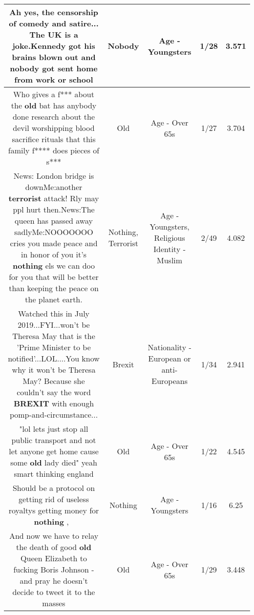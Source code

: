 \documentclass[11pt]{article}
\newlength\mylength
\begin{document}
\begin{center}
\begin{longtable}{|C{.65\mylength}|C{.30\mylength}|C{.12\mylength}|C{.12\mylength}|C{.12\mylength}|}
  \small Ah yes, the censorship of comedy and satire... The UK is a joke.Kennedy got his brains blown out and \textbf{nobody} got sent home from work or school\normalsize   & Nobody & Age - Youngsters & 1/28 & 3.571 \\  \hline
  \small Who gives a f*** about the \textbf{old} bat has anybody done research about the devil worshipping blood sacrifice rituals that this family f**** does pieces of s***\normalsize   & Old & Age - Over 65s & 1/27 & 3.704 \\  \hline
  \small News: London bridge is downMe:another \textbf{terrorist} attack! Rly may ppl hurt then.News:The queen has passed away sadlyMe:NOOOOOOO cries  you made peace and in honor of you it's \textbf{nothing} els we can doo for you that will be better  than keeping the peace on the planet earth.\normalsize   & Nothing, Terrorist & Age - Youngsters, Religious Identity - Muslim & 2/49 & 4.082 \\  \hline
  \small Watched this in July 2019...FYI...won't be Theresa May that is the 'Prime Minister to be notified'...LOL....You know why it won't be Theresa May? Because she couldn't say the word \textbf{BREXIT} with enough pomp-and-circumstance...\normalsize   & Brexit & Nationality - European or anti-Europeans & 1/34 & 2.941 \\  \hline
  \small "lol lets just stop all public transport and not let anyone get home cause some \textbf{old} lady died" yeah smart thinking england\normalsize   & Old & Age - Over 65s & 1/22 & 4.545 \\  \hline
  \small Should be a protocol on getting rid of useless royaltys getting money for \textbf{nothing} , 🤣\normalsize   & Nothing & Age - Youngsters & 1/16 & 6.25 \\  \hline
  \small And now we have to relay the death of good \textbf{old} Queen Elizabeth to fucking Boris Johnson - and pray he doesn't decide to tweet it to the masses\normalsize   & Old & Age - Over 65s & 1/29 & 3.448 \\  \hline

\end{longtable}
\end{center}
\end{document}
